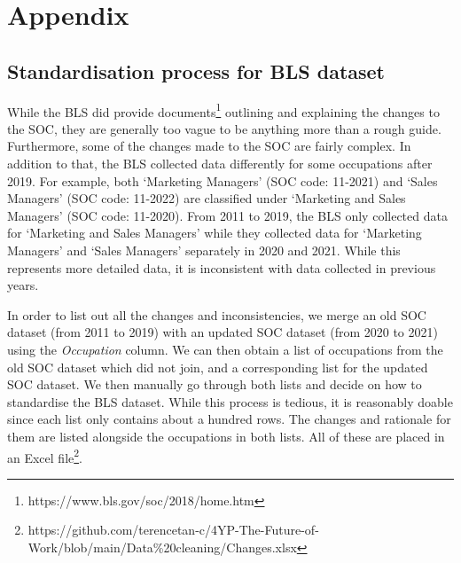 \documentclass[11pt]{article}
\begin{document}
\section*{\hfill Appendix\hfill}

\subsection*{Standardisation process for BLS dataset}
While the BLS did provide documents\footnote{https://www.bls.gov/soc/2018/home.htm} outlining and explaining the changes to the SOC, they are generally too vague to be anything more than a rough guide. Furthermore, some of the changes made to the SOC are fairly complex. In addition to that, the BLS collected data differently for some occupations after 2019. For example, both `Marketing Managers' (SOC code: 11-2021) and `Sales Managers' (SOC code: 11-2022) are classified under `Marketing and Sales Managers' (SOC code: 11-2020). From 2011 to 2019, the BLS only collected data for `Marketing and Sales Managers' while they collected data for `Marketing Managers' and `Sales Managers' separately in 2020 and 2021. While this represents more detailed data, it is inconsistent with data collected in previous years.

In order to list out all the changes and inconsistencies, we merge an old SOC dataset (from 2011 to 2019) with an updated SOC dataset (from 2020 to 2021) using the \emph{Occupation} column. We can then obtain a list of occupations from the old SOC dataset which did not join, and a corresponding list for the updated SOC dataset. We then manually go through both lists and decide on how to standardise the BLS dataset. While this process is tedious, it is reasonably doable since each list only contains about a hundred rows. The changes and rationale for them are listed alongside the occupations in both lists. All of these are placed in an Excel file\footnote{https://github.com/terencetan-c/4YP-The-Future-of-Work/blob/main/Data\%20cleaning/Changes.xlsx}.
\end{document}
